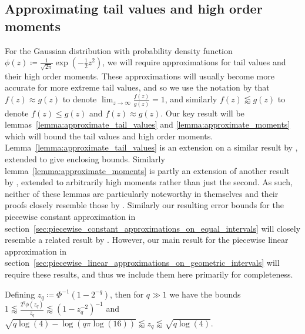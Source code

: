 \documentclass[manuscript,review]{acmart}
\begin{document}
\subsection{Approximating tail values and high order moments}
\label{sec:approximating_tail_values_and_high_order_moments}

For the Gaussian distribution with probability density function $ \phi(z) \coloneqq \tfrac{1}{\sqrt{2\pi}} {\exp}(-\tfrac{1}{2}z^2) $, we will require approximations for tail values and their high order moments. These approximations will usually become more accurate for more extreme tail values, and so we use the notation by \citet{giles2019random_quadrature} that $ f(z) \approx g(z) $ to denote $ \lim_{z\to\infty} \tfrac{f(z)}{g(z)} = 1 $, and similarly $ f(z) \lessapprox g(z) $ to denote $ f(z) \leq g(z) $ and $ f(z) \approx g(z) $. Our key result will be lemmas~\ref{lemma:approximate_tail_values} and \ref{lemma:approximate_moments} which will bound the tail values and high order moments. Lemma~\ref{lemma:approximate_tail_values} is an extension on a similar result by \citet[lemma~7]{giles2019random_quadrature}, extended to give enclosing bounds. Similarly lemma~\ref{lemma:approximate_moments} is partly an extension of another result by \citet[lemma~9]{giles2019random_quadrature}, extended to arbitrarily high moments rather than just the second. As such, neither of these lemmas are particularly noteworthy in themselves and their proofs closely resemble those by \citet[appendix~A]{giles2019random_quadrature}. Similarly our resulting error bounds for the piecewise constant approximation in section~\ref{sec:piecewise_constant_approximations_on_equal_intervals} will closely resemble a related result by \citet[theorem~1]{giles2019random_quadrature}. However, our main result for the piecewise linear approximation in section~\ref{sec:piecewise_linear_approximations_on_geometric_intervals} will require these results, and thus we include them here primarily for completeness. 

\begin{lemma}
\label{lemma:approximate_tail_values}
Defining $ z_q \coloneqq \Phi^{-1}(1 - 2^{-q})$, then for $ q \gg 1 $ we have the bounds $ 1 \lessapprox \tfrac{2^q\phi(z_q)}{z_q} \lessapprox (1 - z_q^{-2})^{-1}$  and $ \sqrt{q \log(4) - \log(q \pi \log(16))} \lessapprox z_q  \lessapprox \sqrt{q \log(4)}$.
\end{lemma}
\end{document}
